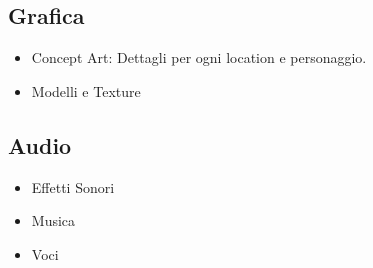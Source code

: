 \documentclass{report}
\begin{document}
\subsection{Grafica}
\begin{itemize}
    \item Concept Art: Dettagli per ogni location e personaggio.
    \item Modelli e Texture
\end{itemize}

\subsection{Audio}
\begin{itemize}
    \item Effetti Sonori
    \item Musica
    \item Voci
\end{itemize}
\end{document}
